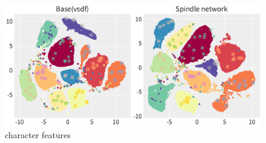 
\begin{figure}[!t]
    \begin{center}
    \includegraphics[width=1.0\linewidth]{figures/tsne.pdf}
    \end{center}
    \caption{character features}
    \label{fig:tsne}
\end{figure}

    